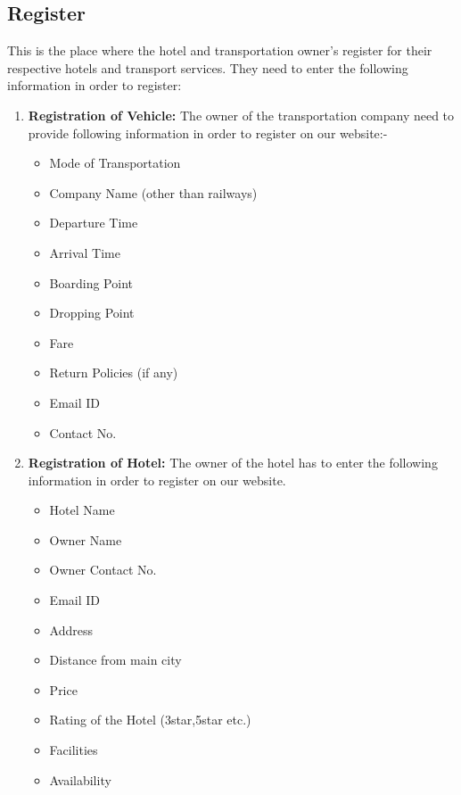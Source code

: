 \documentclass{article}
\begin{document}
\subsection{Register}
This is the place where the hotel and transportation owner's register for their respective hotels and transport services. They need to enter the following information in order to register:
\begin{enumerate}
    \item \textbf{Registration of Vehicle:}
    The owner of the transportation company need to provide following information in order to register on our website:-
    \begin{itemize}
        \item Mode of Transportation
        \item Company Name (other than railways)
        \item Departure Time
        \item Arrival Time
        \item Boarding Point
        \item Dropping Point
        \item Fare
        \item Return Policies (if any)
        \item Email ID
        \item Contact No.
    \end{itemize}
    \item \textbf{Registration of Hotel:}
    The owner of the hotel has to enter the following information in order to register on our website.
    \begin{itemize}
        \item Hotel Name
        \item Owner Name
        \item Owner Contact No.
        \item Email ID
        \item Address
        \item Distance from main city
        \item Price
        \item Rating of the Hotel (3star,5star etc.)
        \item Facilities
        \item Availability
    \end{itemize}
\end{enumerate}
\end{document}
